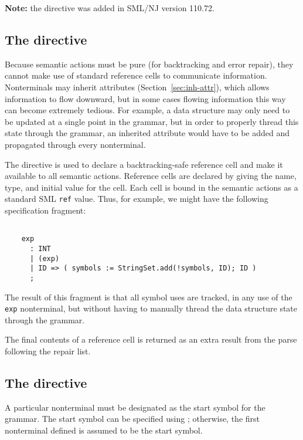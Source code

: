 \noindent{}\textbf{Note:} the  directive was added in SML/NJ version 110.72.

\subsection{The  directive}

Because semantic actions must be pure (for backtracking and error repair), they cannot make use of standard reference cells to communicate information.
Nonterminals may inherit attributes (Section~\ref{sec:inh-attr}), which allows information to flow downward, but in some cases flowing information this way can become extremely tedious.
For example, a data structure may only need to be updated at a single point in the grammar, but in order to properly thread this state through the grammar, an inherited attribute would have to be added and propagated through every nonterminal.

The  directive is used to declare a backtracking-safe reference cell and make it available to all semantic actions.  Reference cells are declared by giving the name, type, and initial value for the cell.  Each cell is bound in the semantic actions as a standard SML \texttt{ref} value.  Thus, for example, we might have the following specification fragment:
\begin{lstlisting}[language=MLAntlr]
    %refcell symbols : StringSet.set = ( StringSet.empty );
    
    exp
      : INT
      | (exp)
      | ID => ( symbols := StringSet.add(!symbols, ID); ID )
      ;
\end{lstlisting}%
The result of this fragment is that all symbol uses are tracked, in any use of
the \texttt{exp} nonterminal, but without having to manually thread the data
structure state through the grammar.

The final contents of a reference cell is returned as an extra result from the parse
following the repair list.

\subsection{The  directive}\label{sec:start}

A particular nonterminal must be designated as the start symbol for the grammar.  The start symbol can be specified using ; otherwise, the first nonterminal defined is assumed to be the start symbol.

